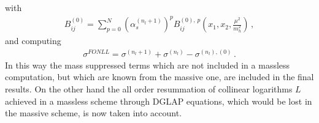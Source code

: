 with
\begin{align}
    B^{(0)}_{ij} = \sum_{p=0}^N \left(\alpha_s^{(n_l+1)}\right)^p  B_{ij}^{(0),\,p}\left(x_1,x_2,\frac{\mu^2}{m_h^2}\right)\,,
\end{align}
and computing 
\begin{align}
    \sigma^{FONLL} = \sigma^{(n_l+1)} + \sigma^{(n_l)} - \sigma^{(n_l),(0)}\,.
\end{align}
In this way the mass suppressed terms which are not included in a massless computation, but which
are known from the massive one, are included in the final results.
On the other hand the all order resummation of collinear logarithms $L$ achieved 
in a massless scheme through DGLAP equations, which would be lost in the massive scheme, is now taken into account.